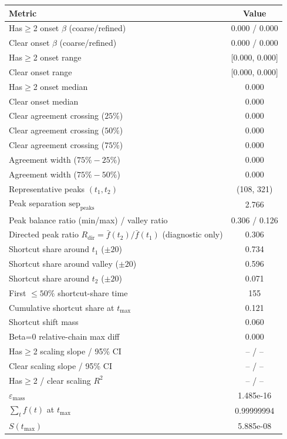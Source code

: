 \begin{tabular}{lc}
\toprule
Metric & Value \\
\midrule
Has$\geq$2 onset $\beta$ (coarse/refined) & 0.000 / 0.000 \\
Clear onset $\beta$ (coarse/refined) & 0.000 / 0.000 \\
Has$\geq$2 onset range & [0.000, 0.000] \\
Clear onset range & [0.000, 0.000] \\
Has$\geq$2 onset median & 0.000 \\
Clear onset median & 0.000 \\
Clear agreement crossing ($25\%$) & 0.000 \\
Clear agreement crossing ($50\%$) & 0.000 \\
Clear agreement crossing ($75\%$) & 0.000 \\
Agreement width ($75\%-25\%$) & 0.000 \\
Agreement width ($75\%-50\%$) & 0.000 \\
Representative peaks $(t_1,t_2)$ & (108, 321) \\
Peak separation $\mathrm{sep}_{\mathrm{peaks}}$ & 2.766 \\
Peak balance ratio (min/max) / valley ratio & 0.306 / 0.126 \\
Directed peak ratio $R_\mathrm{dir}=\bar f(t_2)/\bar f(t_1)$ (diagnostic only) & 0.306 \\
Shortcut share around $t_1$ ($\pm20$) & 0.734 \\
Shortcut share around valley ($\pm20$) & 0.596 \\
Shortcut share around $t_2$ ($\pm20$) & 0.071 \\
First $\le 50\%$ shortcut-share time & 155 \\
Cumulative shortcut share at $t_{\max}$ & 0.121 \\
Shortcut shift mass & 0.060 \\
Beta=0 relative-chain max diff & 0.000 \\
Has$\geq$2 scaling slope / 95\% CI & -- / -- \\
Clear scaling slope / 95\% CI & -- / -- \\
Has$\geq$2 / clear scaling $R^2$ & -- / -- \\
$\varepsilon_{\mathrm{mass}}$ & 1.485e-16 \\
$\sum_t f(t)$ at $t_{\max}$ & 0.99999994 \\
$S(t_{\max})$ & 5.885e-08 \\
\bottomrule
\end{tabular}